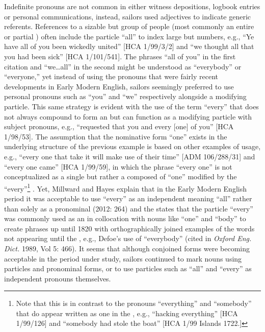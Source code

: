 Indefinite pronouns are not common in either witness depositions, logbook entries or personal communications, instead, sailors used adjectives to indicate generic referents. References to a sizable but  group of people (most commonly an entire or partial ) often include the particle “all” to index large but  numbers, e.g., “Ye have all of you been wickedly united” [HCA 1/99/3/2] and “we thought all that you had been sick” [HCA 1/101/541]. The phrases “all of you” in the first citation and “we…all” in the second might be understood as “everybody” or “everyone,” yet instead of using the  pronouns that were fairly recent developments in Early Modern English, sailors seemingly preferred to use personal pronouns such as “you” and “we” respectively alongside a modifying particle. This same strategy is evident with the use of the term “every” that does not always compound to form an   but can function as a modifying  particle with subject pronouns, e.g., “requested that you and every [one] of you” [HCA 1/98/53]. The assumption that the nominative form “one” exists in the underlying structure of the previous example is based on other examples of usage, e.g., “every one that take it will make use of their time” [ADM 106/288/31] and “every one came” [HCA 1/99/59], in which the phrase “every one” is not conceptualized as a single  but rather a  composed of “one” modified by the  “every”\footnote{Note that this is in contrast to the  pronouns “everything” and “somebody” that do appear written as one  in the , e.g., “hacking everything” [HCA 1/99/126] and “somebody had stole the boat” [HCA 1/99  Islands 1722.]} . Yet, Millward and Hayes explain that in the Early Modern English period it was acceptable to use “every” as an independent  meaning “all” rather than solely as a pronominal  (2012: 264) and the \citet{oed1989} states that the particle “every” was commonly used as an  in collocation with nouns like “one” and “body” to create   phrases up until 1820 with orthographically joined examples of the words not appearing until the , e.g.,  Defoe’s use of “everybody” (cited in \textit{Oxford Eng. Dict.} 1989, Vol 5: 466). It seems that although conjoined forms were becoming acceptable in the period under study, sailors continued to mark  nouns using  particles and pronominal forms, or to use particles such as “all” and “every” as independent pronouns themselves.

